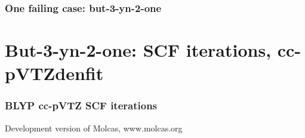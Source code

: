 \begin{frame}
   \frametitle{One failing case: but-3-yn-2-one}
    \begin{center}
        \begin{figure}
        \end{figure}
    \end{center}
\end{frame}

\section{But-3-yn-2-one: SCF iterations, cc-pVTZdenfit}

\begin{frame}
   \frametitle{BLYP cc-pVTZ SCF iterations}
   \tiny{Development version of Molcas, www.molcas.org}
    \begin{center}
        \begin{figure}
        \end{figure}
    \end{center}
\end{frame}

